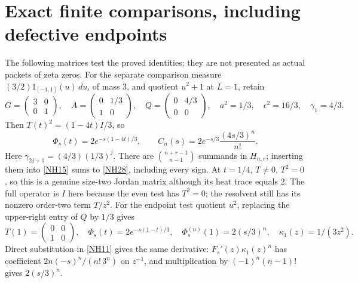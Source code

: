 \documentclass[11pt]{article}
\newcommand{\eps}{\epsilon}\newcommand{\spec}{\operatorname{spec}}
\begin{document}
\section{Exact finite comparisons, including defective endpoints}

The following matrices test the proved identities; they
are not presented as actual packets of zeta zeros.
For the separate comparison measure
\((3/2)1_{[-1,1]}(u)\,du\), of mass \(3\), and quotient
\(u^2+1\) at \(L=1\), retain
\begin{equation}\tag{NH27}\label{NH27}
G=\begin{pmatrix}3&0\\0&1\end{pmatrix},\quad
A=\begin{pmatrix}0&1/3\\1&0\end{pmatrix},\quad
Q=\begin{pmatrix}0&4/3\\0&0\end{pmatrix},\quad
a^2=1/3,\quad \eps^2=16/3,\quad \gamma_1=4/3 .
\end{equation}
Then \(T(t)^2=(1-4t)I/3\), so
\begin{equation}\tag{NH28}\label{NH28}
\Phi_s(t)=2e^{-s(1-4t)/3},\qquad
C_n(s)=2e^{-s/3}\frac{(4s/3)^n}{n!}.
\end{equation}
Here \(\gamma_{2j+1}=(4/3)(1/3)^j\).
There are \(\binom{n+r-1}{n-1}\) summands in \(H_{n,r}\);
inserting them into \eqref{NH15} sums to
\eqref{NH28}, including every sign.
At \(t=1/4\), \(T\ne0\), \(T^2=0\), so this is a
genuine size-two Jordan matrix although its heat trace
equals \(2\). The full operator is \(I\) here because
the even test has \(T^2=0\); the resolvent still has
its nonzero order-two term \(T/z^2\).
For the endpoint test quotient \(u^2\), replacing the
upper-right entry of \(Q\) by \(1/3\) gives
\begin{equation}\tag{NH29}\label{NH29}
T(1)=\begin{pmatrix}0&0\\1&0\end{pmatrix},\quad
\Phi_s(t)=2e^{-s(1-t)/3},\quad
\Phi_s^{(n)}(1)=2(s/3)^n,\quad
\kappa_1(z)=1/(3z^2).
\end{equation}
Direct substitution in \eqref{NH11} gives the same
derivative: \(F_s'(z)\kappa_1(z)^n\) has coefficient
\(2n(-s)^n/(n!\,3^n)\) on \(z^{-1}\), and multiplication
by \((-1)^n(n-1)!\) gives \(2(s/3)^n\).
\end{document}
